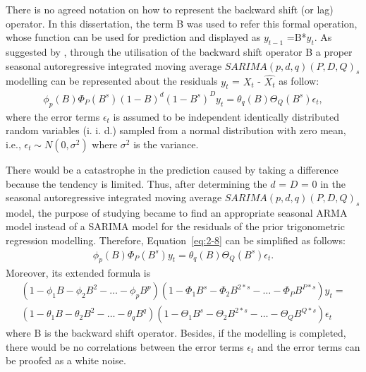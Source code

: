 \documentclass[12pt,msc]{uom_eee_dissertation_casson}
\newcommand{\eqnref}[1]{Equation~\eqref{#1}}
\begin{document}
There is no agreed notation on how to represent the backward shift (or lag) operator. In this dissertation, the term B was used to refer this formal operation, whose function can be used for prediction and displayed as $y_{t-1}$ =B*$y_{t}$. As suggested by \citet[chap. 7]{cowpertwait2009introductory}, through the utilisation of the backward shift operator B a proper seasonal autoregressive integrated moving average $SARIMA(p, d, q)(P, D, Q)_{s}$ modelling can be represented about the residuals $y_{t}$ = $X_{t}$ - $\hat{X_{t}}$ as follow:
\begin{equation}
\label{eq:2-9}
\begin{aligned}
\phi_{p}(B)\Phi_{P}(B^{s})(1-B)^{d}(1-B^{s})^{D}y_{t}=\theta_{q}(B)\Theta_{Q}(B^{s}) \epsilon_{t},
\end{aligned}
\end{equation}
where the error terms $\epsilon_{t}$ is assumed to be independent identically distributed random variables (i. i. d.) sampled from a normal distribution with zero mean, i.e., $\epsilon_{t}\sim N(0, \sigma^{2})$ where $\sigma^{2}$ is the variance.

There would be a catastrophe in the prediction caused by taking a difference because the tendency is limited. Thus, after determining the $d$ = $D$ = $0$ in the seasonal autoregressive integrated moving average $SARIMA(p, d, q)(P, D, Q)_{s}$ model, the purpose of studying became to find an appropriate seasonal ARMA model instead of a SARIMA model for the residuals of the prior trigonometric regression modelling. Therefore, \eqnref{eq:2-8} can be simplified as follows:
\begin{equation}
\label{eq:2-10}
\begin{aligned}
\phi_{p}(B)\Phi_{P}(B^{s})y_{t}=\theta_{q}(B)\Theta_{Q}(B^{s}) \epsilon_{t}.
\end{aligned}
\end{equation}
Moreover, its extended formula is
\begin{equation}
\label{eq:2-11}
\begin{aligned}
(1-\phi_{1}B-\phi_{2}B^{2}-\dots-\phi_{p}B^{p})(1-\Phi_{1}B^{s}-\Phi_{2}B^{2*s}-\dots -\Phi_{P}B^{P*s})y_{t}= \\ (1-\theta_{1}B-\theta_{2}B^{2}-\dots-\theta_{q}B^{q})(1-\Theta_{1}B^{s}-\Theta_{2}B^{2*s}-\dots -\Theta_{Q}B^{Q*s})\epsilon_{t}
\end{aligned}
\end{equation}
where B is the backward shift operator. Besides, if the modelling is completed, there would be no correlations between the error terms $\epsilon_{t}$ and the error terms can be proofed as a white noise.
\end{document}
